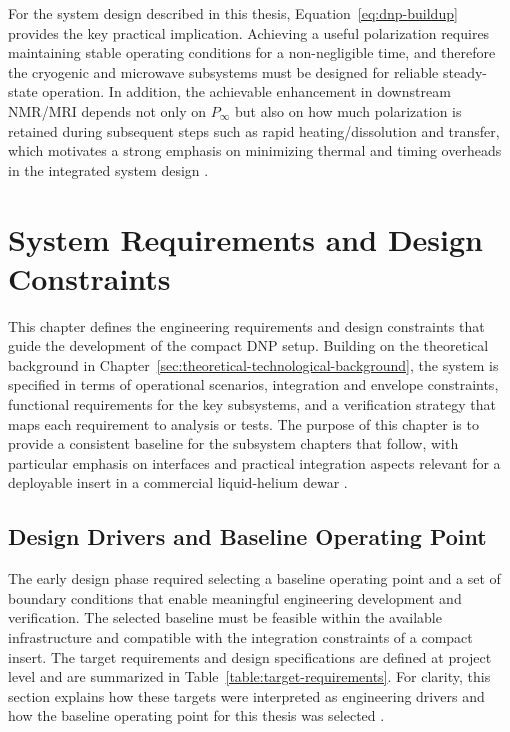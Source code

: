 \documentclass[FM,DP,EN,twoside]{tulthesis}
\begin{document}
For the system design described in this thesis, Equation~\ref{eq:dnp-buildup} provides the key practical implication. Achieving a useful polarization requires maintaining stable operating conditions for a non-negligible time, and therefore the cryogenic and microwave subsystems must be designed for reliable steady-state operation. In addition, the achievable enhancement in downstream NMR/MRI depends not only on $P_\infty$ but also on how much polarization is retained during subsequent steps such as rapid heating/dissolution and transfer, which motivates a strong emphasis on minimizing thermal and timing overheads in the integrated system design \cite{dissolution_dnp_workflow_ref}.


\chapter{System Requirements and Design Constraints}
\label{sec:system-requirements-design-constraints}

This chapter defines the engineering requirements and design constraints that guide the development of the compact DNP setup. Building on the theoretical background in Chapter~\ref{sec:theoretical-technological-background}, the system is specified in terms of operational scenarios, integration and envelope constraints, functional requirements for the key subsystems, and a verification strategy that maps each requirement to analysis or tests. The purpose of this chapter is to provide a consistent baseline for the subsystem chapters that follow, with particular emphasis on interfaces and practical integration aspects relevant for a deployable insert in a commercial liquid-helium dewar \cite{Kowalska2023MABudget}.


\section{Design Drivers and Baseline Operating Point}
\label{sec:design-drivers-baseline}

The early design phase required selecting a baseline operating point and a set of boundary conditions that enable meaningful engineering development and verification. The selected baseline must be feasible within the available infrastructure and compatible with the integration constraints of a compact insert. The target requirements and design specifications are defined at project level and are summarized in Table~\ref{table:target-requirements}. For clarity, this section explains how these targets were interpreted as engineering drivers and how the baseline operating point for this thesis was selected \cite{Kowalska2023MABudget}.
\end{document}
